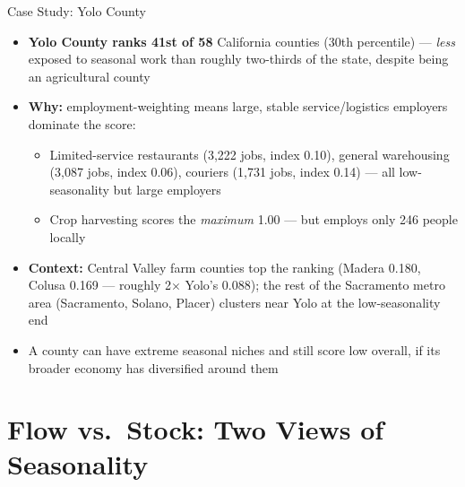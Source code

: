 \documentclass[aspectratio=169]{beamer}
\begin{document}
\begin{frame}{Case Study: Yolo County}
  \begin{itemize}
    \item \textbf{Yolo County ranks 41st of 58} California counties (30th
          percentile) --- \emph{less} exposed to seasonal work than roughly
          two-thirds of the state, despite being an agricultural county
    \bigskip
    \item \textbf{Why:} employment-weighting means large, stable
          service/logistics employers dominate the score:
    \begin{itemize}
      \item Limited-service restaurants (3,222 jobs, index 0.10), general
            warehousing (3,087 jobs, index 0.06), couriers (1,731 jobs,
            index 0.14) --- all low-seasonality but large employers
      \item Crop harvesting scores the \emph{maximum} 1.00 --- but employs
            only 246 people locally
    \end{itemize}
    \bigskip
    \item \textbf{Context:} Central Valley farm counties top the ranking
          (Madera 0.180, Colusa 0.169 --- roughly 2$\times$ Yolo's 0.088);
          the rest of the Sacramento metro area (Sacramento, Solano, Placer)
          clusters near Yolo at the low-seasonality end
    \item[$\to$] A county can have extreme seasonal niches and still score
          low overall, if its broader economy has diversified around them
  \end{itemize}
\end{frame}

\section{Flow vs.\ Stock: Two Views of Seasonality}
\end{document}

